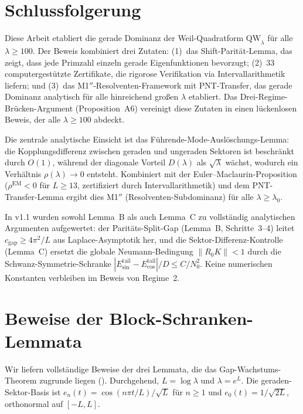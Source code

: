 \documentclass[12pt,a4paper]{article}
\theoremstyle{definition}
\theoremstyle{remark}
\begin{document}
\section{Schlussfolgerung}

Diese Arbeit etabliert die gerade Dominanz der Weil-Quadratform $\mathrm{QW}_\lambda$ für alle $\lambda \geq 100$. Der Beweis kombiniert drei Zutaten: (1)~das Shift-Parität-Lemma, das zeigt, dass jede Primzahl einzeln gerade Eigenfunktionen bevorzugt; (2)~33 computergestützte Zertifikate, die rigorose Verifikation via Intervallarithmetik liefern; und (3)~das M1$''$-Resolventen-Framework mit PNT-Transfer, das gerade Dominanz analytisch für alle hinreichend großen $\lambda$ etabliert. Das Drei-Regime-Brücken-Argument (Proposition~A6) vereinigt diese Zutaten in einen lückenlosen Beweis, der alle $\lambda \geq 100$ abdeckt.

Die zentrale analytische Einsicht ist das Führende-Mode-Auslöschungs-Lemma: die Kopplungsdifferenz zwischen geraden und ungeraden Sektoren ist beschränkt durch $O(1)$, während der diagonale Vorteil $D(\lambda)$ als $\sqrt{\lambda}$ wächst, wodurch ein Verhältnis $\rho(\lambda) \to 0$ entsteht. Kombiniert mit der Euler--Maclaurin-Proposition ($\rho^{\mathrm{EM}} < 0$ für $L \geq 13$, zertifiziert durch Intervallarithmetik) und dem PNT-Transfer-Lemma ergibt dies M1$''$ (Resolventen-Subdominanz) für alle $\lambda \geq \lambda_0$.

In v1.1 wurden sowohl Lemma~B als auch Lemma~C zu vollständig analytischen Argumenten aufgewertet: der Paritäts-Split-Gap (Lemma~B, Schritte~3--4) leitet $c_{\mathrm{gap}} \geq 4\pi^2/L$ aus Laplace-Asymptotik her, und die Sektor-Differenz-Kontrolle (Lemma~C) ersetzt die globale Neumann-Bedingung $\|R_0 K\| < 1$ durch die Schwanz-Symmetrie-Schranke $|E_{\sin}^{\mathrm{tail}} - E_{\cos}^{\mathrm{tail}}|/D \leq C/N_0^2$. Keine numerischen Konstanten verbleiben im Beweis von Regime~2.

\appendix
\section{Beweise der Block-Schranken-Lemmata}
\label{app:block-proofs}

Wir liefern vollständige Beweise der drei Lemmata, die das Gap-Wachstums-Theorem zugrunde liegen (). Durchgehend, $L = \log\lambda$ und $\lambda = e^L$. Die geraden-Sektor-Basis ist $e_n(t) = \cos(n\pi t/L)/\sqrt{L}$ für $n \geq 1$ und $e_0(t) = 1/\sqrt{2L}$, orthonormal auf $[-L, L]$.
\end{document}
